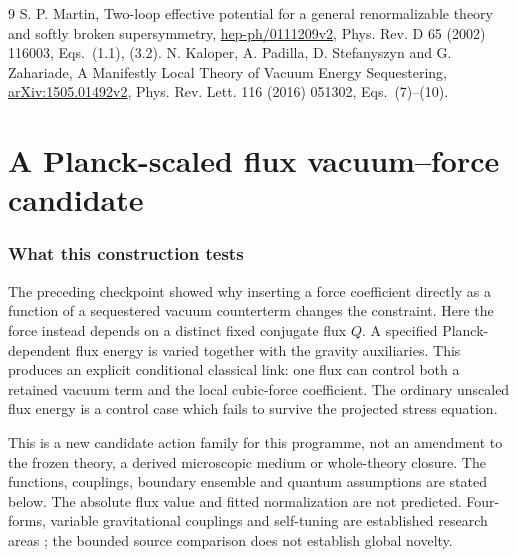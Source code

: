 \documentclass[11pt]{article}
\begin{document}
\begin{thebibliography}{9}
 S. P. Martin, Two-loop effective potential for a general
renormalizable theory and softly broken supersymmetry,
\href{https://arxiv.org/pdf/hep-ph/0111209v2}{hep-ph/0111209v2},
Phys. Rev. D 65 (2002) 116003, Eqs.~(1.1), (3.2).
 N. Kaloper, A. Padilla, D. Stefanyszyn and
G. Zahariade, A Manifestly Local Theory of Vacuum Energy Sequestering,
\href{https://arxiv.org/pdf/1505.01492v2}{arXiv:1505.01492v2},
Phys. Rev. Lett. 116 (2016) 051302, Eqs.~(7)--(10).
\end{thebibliography}

\clearpage

\part{A Planck-scaled flux vacuum--force candidate}

\section{What this construction tests}
The preceding checkpoint showed why inserting a force coefficient directly
as a function of a sequestered vacuum counterterm changes the constraint.
Here the force instead depends on a distinct fixed conjugate flux $Q$.
A specified Planck-dependent flux energy is varied together with the
gravity auxiliaries. This produces an explicit conditional classical link:
one flux can control both a retained vacuum term and the local cubic-force
coefficient. The ordinary unscaled flux energy is a control case which
fails to survive the projected stress equation.

This is a new candidate action family for this programme, not an amendment
to the frozen theory, a derived microscopic medium or whole-theory closure.
The functions, couplings, boundary ensemble and quantum assumptions are
stated below. The absolute flux value and fitted normalization are not
predicted. Four-forms, variable gravitational couplings and self-tuning
are established research areas \cite{pf:sequester,pf:qtheory,pf:planck};
the bounded source comparison does not establish global novelty.
\end{document}
